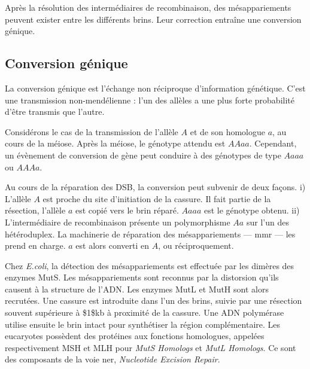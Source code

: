 \documentclass[11pt, oneside]{scrartcl}
\begin{document}
\begin{transition}
Après la résolution des intermédiaires de recombinaison, des mésappariements
peuvent exister entre les différents brins. Leur correction entraîne une
conversion génique.
\end{transition}


\subsection{Conversion génique}
\label{sec:orgheadline2}
La conversion génique est l'échange non réciproque d'information génétique.
C'est une transmission non-mendélienne : l'un des allèles a une plus forte
probabilité d'être transmis que l'autre\cite{chen_gene_2007}. 

Considérons le cas de la transmission de l'allèle \(A\) et de son homologue \(a\),
au cours de la méiose. Après la méiose, le génotype attendu est \(AAaa\).
Cependant, un évènement de conversion de gène peut conduire à des génotypes de
type \(Aaaa\) ou \(AAAa\). 

Au cours de la réparation des DSB, la conversion peut subvenir de deux façons.
i) L'allèle \(A\) est proche du site d'initiation de la cassure. Il fait partie de
la résection, l'allèle \(a\) est copié vers le brin réparé. \(Aaaa\) est le génotype
obtenu. ii) L'intermédiaire de recombinaison présente un polymorphisme \(Aa\) sur
l'un des hétéroduplex. La machinerie de réparation des mésappariements ---
\ac{mmr} --- les prend en charge. \(a\) est alors converti en \(A\), ou
réciproquement.

Chez \emph{E.coli}, la détection des mésappariements est effectuée par les dimères
des enzymes MutS. Les mésappariements sont reconnus par la distorsion qu'ils
causent à la structure de l'ADN. Les enzymes MutL et MutH sont alors recrutées.
Une cassure est introduite dans l'un des brins, suivie par une résection souvent
supérieure à \$1\$kb à proximité de la cassure. Une ADN polymérase utilise ensuite
le brin intact pour synthétiser la région complémentaire. Les eucaryotes
possèdent des protéines aux fonctions homologues, appelées respectivement MSH et
MLH pour \emph{MutS Homologs} et \emph{MutL Homologs}. Ce sont des composants de la voie
\ac{ner}, \emph{Nucleotide Excision Repair}.
\end{document}
